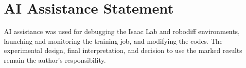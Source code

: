 \documentclass[UTF8]{ctexart}
\begin{document}
\section{AI Assistance Statement}

AI assistance was used for debugging the Isaac Lab and robodiff environments, launching and monitoring the training job, and modifying the codes. The experimental design, final interpretation, and decision to use the marked results remain the author's responsibility.
\end{document}
